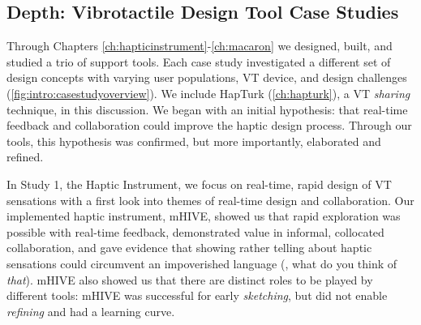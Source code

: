 \subsection{Depth: Vibrotactile Design Tool Case Studies}
Through Chapters \ref{ch:hapticinstrument}-\ref{ch:macaron} we designed, built, and studied a trio of \haxd support tools.
Each case study investigated a different set of design concepts with varying user populations, VT device, and design challenges (\autoref{fig:intro:casestudyoverview}).
We include HapTurk (\autoref{ch:hapturk}), a VT \emph{sharing} technique, in this discussion.
We began with an initial hypothesis: that real-time feedback and collaboration could improve the haptic design process.
Through our tools, this hypothesis was confirmed, but more importantly, elaborated and refined.

In Study 1, the Haptic Instrument, we focus on real-time, rapid design of VT sensations with a first look into themes of real-time design and collaboration.
Our implemented haptic instrument, mHIVE, showed us that rapid exploration was possible with real-time feedback, demonstrated value in informal, collocated collaboration, and gave evidence that showing rather telling about haptic sensations could circumvent an impoverished language (\eg, what do you think of \emph{that}).
 mHIVE also showed us that there are distinct roles to be played by different tools: mHIVE was successful for early \emph{sketching}, but did not enable \emph{refining} and had a learning curve.


